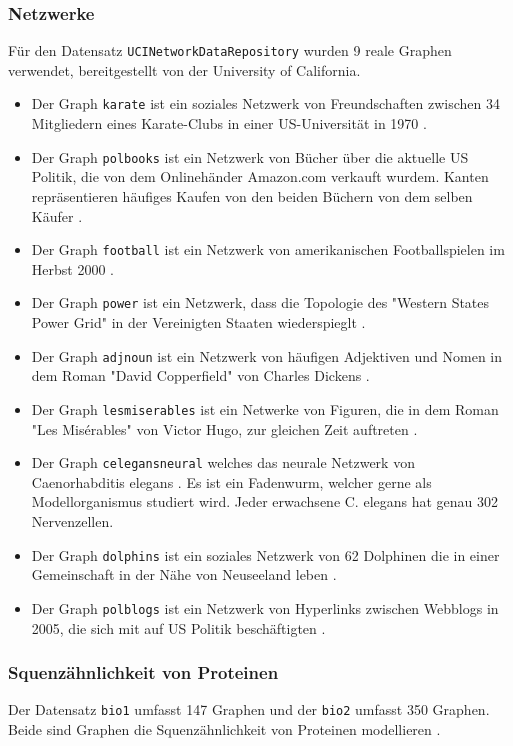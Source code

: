 \documentclass[12pt,a4paper,onecolumn,oneside,titlepage]{article}
\newcommand{\vars}{\texttt}
\begin{document}
\subsubsection{Netzwerke}
Für den Datensatz \vars{UCINetworkDataRepository} wurden 9 reale Graphen verwendet, bereitgestellt von der University of California.
\begin{itemize}
\item Der Graph \vars{karate} ist ein soziales Netzwerk von Freundschaften zwischen 34 Mitgliedern eines Karate-Clubs in einer US-Universität in 1970 \cite{Zachary77}.
\item Der Graph \vars{polbooks} ist ein Netzwerk von Bücher über die aktuelle US Politik, die von dem Onlinehänder Amazon.com verkauft wurdem. Kanten repräsentieren häufiges Kaufen von den beiden Büchern von dem selben Käufer \cite{polbooks}.
\item Der Graph \vars{football} ist ein Netzwerk von amerikanischen Footballspielen im Herbst 2000 \cite{Girvan02}.
\item Der Graph \vars{power} ist ein Netzwerk, dass die Topologie des "Western States Power Grid" in der Vereinigten Staaten wiederspieglt  \cite{Watts98}.
\item Der Graph \vars{adjnoun} ist ein Netzwerk von häufigen Adjektiven und Nomen in dem Roman "David Copperfield" von Charles Dickens \cite{Newman06}.
\item Der Graph \vars{lesmiserables} ist ein Netwerke von Figuren, die in dem  Roman "Les Misérables" von Victor Hugo, zur gleichen Zeit auftreten \cite{Knuth93}. 
\item Der Graph \vars{celegansneural} welches das neurale Netzwerk von Caenorhabditis elegans \cite{Watts98}. Es ist ein Fadenwurm, welcher gerne als Modellorganismus studiert wird. Jeder erwachsene C. elegans hat genau 302 Nervenzellen.
\item Der Graph \vars{dolphins} ist ein soziales Netzwerk von 62 Dolphinen die in einer Gemeinschaft in der Nähe von Neuseeland leben \cite{Lusseau03}. 
\item Der Graph \vars{polblogs} ist ein Netzwerk von Hyperlinks zwischen Webblogs in 2005, die sich mit auf US Politik beschäftigten \cite{Adamic05}.
\end{itemize}



\subsubsection{Squenzähnlichkeit von Proteinen}
Der Datensatz  \vars{bio1} umfasst 147 Graphen und der \vars{bio2} umfasst 350 Graphen. Beide sind Graphen die Squenzähnlichkeit von Proteinen modellieren \cite{Rahmann07,Bocker08}.
\end{document}
